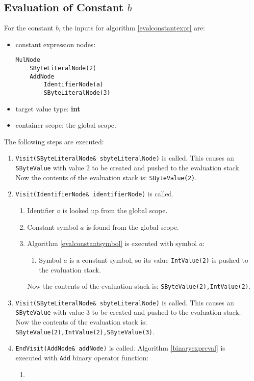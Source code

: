\documentclass[a4paper,oneside,11pt]{book}
\theoremstyle{definition}
\begin{document}
\subsection{Evaluation of Constant $b$}
For the constant $b$, the inputs for algorithm \ref{evalconstantexpr} are:
\begin{itemize}
\item
constant expression nodes:
\begin{verbatim}
MulNode
    SByteLiteralNode(2)
    AddNode
        IdentifierNode(a)
        SByteLiteralNode(3)
\end{verbatim}
\item
target value type: \textbf{int}
\item
container scope: the global scope.
\end{itemize}
The following steps are executed:
\begin{enumerate}
\item
\verb|Visit(SByteLiteralNode& sbyteLiteralNode)| is called.
This causes an \verb|SByteValue| with value 2 to be created and pushed to the evaluation stack.
Now the contents of the evaluation stack is: \verb|SByteValue(2)|.
\item
\verb|Visit(IdentifierNode& identifierNode)| is called.
\begin{enumerate}
\item
Identifier $a$ is looked up from the global scope.
\item
Constant symbol $a$ is found from the global scope.
\item
Algorithm \ref{evalconstantsymbol} is executed with symbol $a$:
\begin{enumerate}
\item
Symbol $a$ is a constant symbol, so its value \verb|IntValue(2)| is pushed to the evaluation stack.
\end{enumerate}
Now the contents of the evaluation stack is: \verb|SByteValue(2),IntValue(2)|.
\end{enumerate}
\item
\verb|Visit(SByteLiteralNode& sbyteLiteralNode)| is called.
This causes an \verb|SByteValue| with value 3 to be created and pushed to the evaluation stack.
Now the contents of the evaluation stack is: \verb|SByteValue(2),IntValue(2),SByteValue(3)|.
\item
\verb|EndVisit(AddNode& addNode)| is called:
Algorithm \ref{binaryexpreval} is executed with \verb|Add| binary operator function:
\begin{enumerate}
\item

\end{enumerate}
\end{enumerate}
\end{document}
